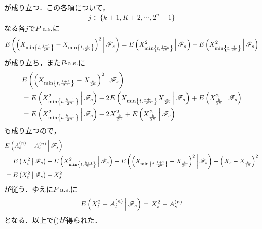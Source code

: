 \begin{sketch}
\begin{description}
\begin{align}
				\end{align}
				が成り立つ．この各項について，
				\begin{align}
					j \in \{k+1,K+2,\cdots,2^n-1\}
				\end{align}
				なる各$j$で$P$-a.s.に
				\begin{align}
					E\left(  \left(X_{\min\left\{t,\frac{j+1}{2^n}\right\}} - X_{\min\left\{t,\frac{j}{2^n}\right\}}\right)^2 \, \middle|\, \mathscr{F}_s \right)
					= E\left( X^2_{\min\left\{t,\frac{j+1}{2^n}\right\}} \, \middle|\, \mathscr{F}_s \right)
					 - E\left( X^2_{\min\left\{t,\frac{j}{2^n}\right\}} \, \middle|\, \mathscr{F}_s \right)
				\end{align}
				が成り立ち，また$P$-a.s.に
				\begin{align}
					&E\left( \left(X_{\min\left\{t,\frac{k+1}{2^n}\right\}} - X_{\frac{k}{2^n}}\right)^2 \, \middle|\, \mathscr{F}_s \right) \\
					&= E\left( X_{\min\left\{t,\frac{k+1}{2^n}\right\}}^2 \, \middle|\, \mathscr{F}_s \right)
					- 2 E\left( X_{\min\left\{t,\frac{k+1}{2^n}\right\}}X_{\frac{k}{2^n}} \, \middle|\, \mathscr{F}_s \right)
					+ E\left( X_{\frac{k}{2^n}}^2 \, \middle|\, \mathscr{F}_s \right) \\
					&= E\left( X_{\min\left\{t,\frac{k+1}{2^n}\right\}}^2 \, \middle|\, \mathscr{F}_s \right)
					- 2 X_{\frac{k}{2^n}}^2
					+ E\left( X_{\frac{k}{2^n}}^2 \, \middle|\, \mathscr{F}_s \right) \\
				\end{align}
				も成り立つので，
				\begin{align}
					&E\left( A^{(n)}_t - A^{(n)}_s \, \middle|\, \mathscr{F}_s \right) \\
					&= E\left( X^2_t \, \middle|\, \mathscr{F}_s \right)
					- E\left( X^2_{\min\left\{t,\frac{k+1}{2^n}\right\}} \, \middle|\, \mathscr{F}_s \right)
					+ E\left( \left(X_{\min\left\{t,\frac{k+1}{2^n}\right\}} - X_{\frac{k}{2^n}}\right)^2 \, \middle|\, \mathscr{F}_s \right)
					- \left(X_s - X_{\frac{k}{2^n}}\right)^2 \\
					&= E\left( X^2_t \, \middle|\, \mathscr{F}_s \right) - X_s^2
				\end{align}
				が従う．ゆえに$P$-a.s.に
				\begin{align}
					E\left( X^2_t - A^{(n)}_t \, \middle|\, \mathscr{F}_s \right) = X^2_s - A^{(n)}_s
				\end{align}
				となる．以上で()が得られた．
				

\end{description}
\end{sketch}
